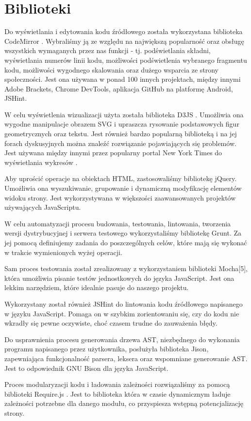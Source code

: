 \documentclass[a4paper,twoside,openright,11pt]{report}
\begin{document}
  \section{Biblioteki}
\par Do wyświetlania i edytowania kodu źródłowego została wykorzystana biblioteka CodeMirror \cite{cm}. Wybraliśmy ją ze względu na największą popularność oraz obsługę wszystkich wymaganych przez nas funkcji - tj. podświetlania składni, wyświetlania numerów linii kodu, możliwości podświetlenia wybranego fragmentu kodu, możliwości wygodnego skalowania oraz dużego wsparcia ze strony społeczności. Jest ona używana w ponad 100 innych projektach, między innymi Adobe Brackets, Chrome DevTools, aplikacja GitHub na platformę Android, JSHint. \cite{jshint}
\par W celu wyświetlenia wizualizacji użyta została biblioteka D3JS \cite{d3js}. Umożliwia ona wygodne manipulacje obrazem SVG i upraszcza rysowanie podstawowych figur geometrycznych oraz tekstu. Jest również bardzo popularną biblioteką i na jej forach dyskusyjnych można znaleźć rozwiązanie pojawiających się problemów. Jest używana między innymi przez popularny portal New York Times do wyświetlania wykresów \cite{ny}.
\par Aby uprościć operacje na obiektach HTML, zastosowaliśmy bibliotekę jQuery. \cite{jquery} Umożliwia ona wyszukiwanie, grupowanie i dynamiczną modyfikację elementów widoku strony. Jest wykorzystywana w większości zaawansowanych projektów używających JavaScriptu.
\par W celu automatyzacji procesu budowania, testowania, lintowania, tworzenia wersji dystrybucyjnej i serwera testowego wykorzystaliśmy bibliotekę Grunt.\cite{gruntjs} Za jej pomocą definiujemy zadania do poszczególnych celów, które mają się wykonać w trakcie wymienionych wyżej operacji. 
\par Sam proces testowania został zrealizowany z wykorzystaniem biblioteki Mocha[5], która umożliwia pisanie testów jednostkowych do języka JavaScript. Jest ona lekkim narzędziem, które idealnie pasuje do naszego projektu.
\par Wykorzystany został również JSHint\cite{jshint} do lintowania kodu źródłowego napisanego w języku JavaScript. Pomaga on w szybkim zorientowaniu się, czy do kodu nie wkradły się pewne oczywiste, choć czasem trudne do zauważenia błędy.
\par Do usprawnienia procesu generowania drzewa AST, niezbędnego do wykonania programu napisanego przez użytkownika, posłużyła biblioteka Jison\cite{jison}, zapewniająca funkcjonalność parsera, leksera oraz wspomniane generowanie AST. Jest to odpowiednik GNU Bison dla języka JavaScript.
\par Proces modularyzacji kodu i ładowania zależności rozwiązaliśmy za pomocą biblioteki Require.js \cite{requirejs}. Jest to biblioteka która w czasie dynamicznym ładuje zależności potrzebne dla danego modułu, co przyspiesza wstępną potencjalizację strony. 
\end{document}
